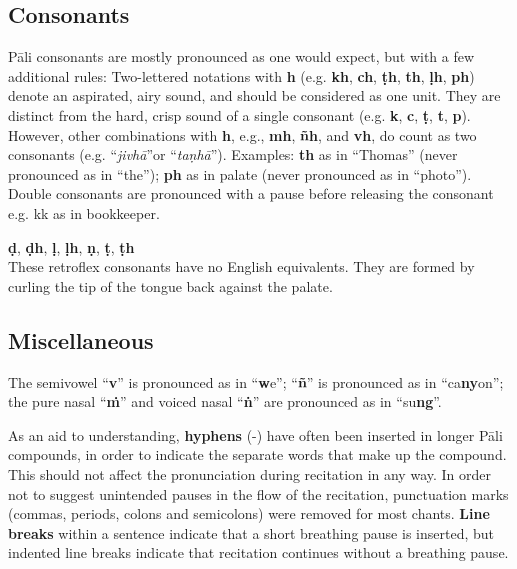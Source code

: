 
\subsection*{Consonants}

Pāli consonants are mostly pronounced as one would expect, but with a few additional rules:  Two-lettered notations with \textbf{h} (e.g. \textbf{kh}, \textbf{ch}, \textbf{ṭh}, \textbf{th}, \textbf{ḷh}, \textbf{ph}) denote an aspirated, airy sound, and should be considered as one unit. They are distinct from the hard, crisp sound of a single consonant (e.g. \textbf{k}, \textbf{c}, \textbf{ṭ}, \textbf{t}, \textbf{p}). However, other combinations with \textbf{h}, e.g., \textbf{mh}, \textbf{ñh}, and \textbf{vh}, do count as two consonants (e.g. ``\textit{jivhā}''or ``\textit{taṇhā}'').  Examples: \textbf{th} as in ``Thomas'' (never pronounced as in ``the''); \textbf{ph} as in palate (never pronounced as in ``photo''). Double consonants are pronounced with a pause before releasing the consonant e.g. kk as in bookkeeper.




\textbf{ḍ}, \textbf{ḍh}, \textbf{ḷ}, \textbf{ḷh}, \textbf{ṇ}, \textbf{ṭ}, \textbf{ṭh}\\
These retroflex consonants have no English equivalents. They are formed by curling the tip of the tongue back against the palate.

\ifafiveversion\clearpage\fi
\ifasixversion\clearpage\fi

\subsection*{Miscellaneous}

The semivowel ``\textbf{v}'' is pronounced as in ``\textbf{w}e''; ``\textbf{ñ}'' is pronounced as in ``ca\textbf{ny}on''; the pure nasal ``\textbf{ṁ}'' and voiced nasal ``\textbf{ṅ}'' are pronounced as in ``su\textbf{ng}''.


As an aid to understanding, \textbf{hyphens} (-) have often been inserted in longer Pāli compounds, in order to indicate the separate words that make up the compound. This should not affect the pronunciation during recitation in any way. In order not to suggest unintended pauses in the flow of the recitation, punctuation marks (commas, periods, colons and semicolons) were removed for most chants. \textbf{Line breaks} within a sentence indicate that a short breathing pause is inserted, but indented line breaks indicate that recitation continues without a breathing pause.

